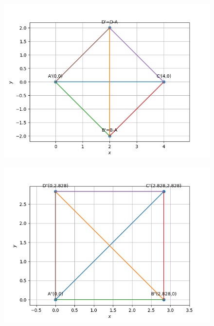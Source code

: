 \begin{figure}[!h]
	\begin{center} 
	    \includegraphics[width=\columnwidth]{chapters/10/7/4/4/figs/square1}
	\end{center}
\caption{}
\label{fig:7/4/4/4Fig2}
\end{figure}
\begin{figure}[!h]
	\begin{center} 
	    \includegraphics[width=\columnwidth]{chapters/10/7/4/4/figs/square2}
	\end{center}
\caption{}
\label{fig:7/4/4/4Fig3}
\end{figure}
